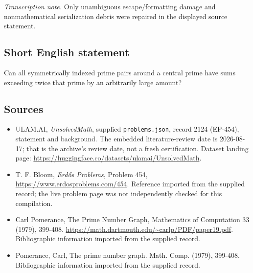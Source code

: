 \documentclass[11pt,a4paper]{article}
\begin{document}
{\small\emph{Transcription note.} Only unambiguous escape/formatting damage and nonmathematical serialization debris were repaired in the displayed source statement.}

\subsection{Short English statement}

Can all symmetrically indexed prime pairs around a central prime have sums exceeding twice that prime by an arbitrarily large amount?

\subsection{Sources}

{\small

\begin{itemize}

\item[\hypertarget{source:2124:1}{S1}] ULAM.AI, \emph{UnsolvedMath}, supplied \texttt{problems.json}, record 2124 (EP-454), statement and background. The embedded literature-review date is 2026-08-17; that is the archive’s review date, not a fresh certification. Dataset landing page: \url{https://huggingface.co/datasets/ulamai/UnsolvedMath}.

\item[\hypertarget{source:2124:2}{S2}] T. F. Bloom, \emph{Erdős Problems}, Problem 454, \url{https://www.erdosproblems.com/454}. Reference imported from the supplied record; the live problem page was not independently checked for this compilation.

\item[\hypertarget{source:2124:3}{S3}] Carl Pomerance, The Prime Number Graph, Mathematics of Computation 33 (1979), 399-408. \url{https://math.dartmouth.edu/~carlp/PDF/paper19.pdf}. Bibliographic information imported from the supplied record.

\item[\hypertarget{source:2124:4}{S4}] Pomerance, Carl, The prime number graph. Math. Comp. (1979), 399-408. Bibliographic information imported from the supplied record.

\end{itemize}

}

\label{end:2124}
\end{document}
